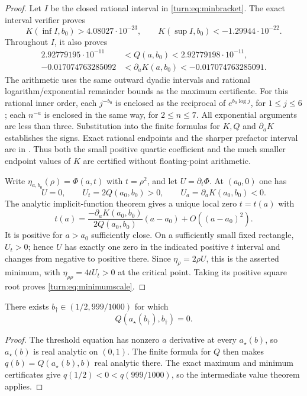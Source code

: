 \begin{proof}
Let $I$ be the closed rational interval in
\eqref{turn:eq:minbracket}. The exact interval verifier
 proves
\[
 K(\inf I,b_0)>4.08027\cdot10^{-23},\qquad
 K(\sup I,b_0)<-1.29944\cdot10^{-22}.
\]
Throughout $I$, it also proves
\begin{align*}
 2.92779195\cdot10^{-11}
     &<Q(a,b_0)<2.92779198\cdot10^{-11},\\
 -0.017074763285092
     &<\partial_a K(a,b_0)<-0.017074763285091.
\end{align*}
The arithmetic uses the same outward dyadic intervals and rational
logarithm/exponential remainder bounds as the maximum certificate.
For this rational inner order, each $j^{-b_0}$ is enclosed as the
reciprocal of $e^{b_0\log j}$, for $1\leq j\leq6$; each
$n^{-a}$ is enclosed in the same way, for $2\leq n\leq7$.
All exponential arguments are less than three. Substitution into
the finite formulas for $K,Q$ and $\partial_aK$ establishes the
signs. Exact rational endpoints and the sharper prefactor interval
are in . Thus both the
small positive quartic coefficient and the much smaller endpoint
values of $K$ are certified without floating-point arithmetic.

Write $\eta_{a,b_0}(\rho)=\Phi(a,t)$ with $t=\rho^2$, and
let $U=\partial_t\Phi$. At $(a_0,0)$ one has
\[
 U=0,\qquad U_t=2Q(a_0,b_0)>0,\qquad
 U_a=\partial_aK(a_0,b_0)<0.
\]
The analytic implicit-function theorem gives a unique local zero
$t=t(a)$ with
\[
 t(a)=\frac{-\partial_aK(a_0,b_0)}{2Q(a_0,b_0)}
                (a-a_0)+O((a-a_0)^2).
\]
It is positive for $a>a_0$ sufficiently close. On a sufficiently
small fixed rectangle, $U_t>0$; hence $U$ has exactly one zero in
the indicated positive $t$ interval and changes from negative to
positive there. Since $\eta_\rho=2\rho U$, this is the asserted
minimum, with $\eta_{\rho\rho}=4tU_t>0$ at the critical point.
Taking its positive square root proves
\eqref{turn:eq:minimumscale}.
\end{proof}

\begin{corollary}
\label{turn:cor:quarticzero}
There exists $b_\dagger\in(1/2,999/1000)$ for which
\[
 Q(a_\star(b_\dagger),b_\dagger)=0.
\]
\end{corollary}

\begin{proof}
The threshold equation has nonzero $a$ derivative at every
$a_\star(b)$, so $a_\star(b)$ is real analytic on $(0,1)$.
The finite formula for $Q$ then makes
$q(b)=Q(a_\star(b),b)$ real analytic there. The exact maximum and
minimum certificates give $q(1/2)<0<q(999/1000)$, so the
intermediate value theorem applies.
\end{proof}


